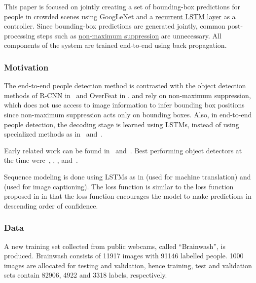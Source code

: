\documentclass[a4paper, 12pt]{article}
\begin{document}
This paper is focused on jointly creating a set of bounding-box predictions for
people in crowded scenes using GoogLeNet and a
\hyperref[LSTM]{recurrent LSTM layer} as a controller. Since bounding-box
predictions are generated jointly, common post-processing steps such as
\hyperref[nonmax_supression]{non-maximum suppression} are unnecessary.  All
components of the system are trained end-to-end using back propagation.

\subsubsection{Motivation}

The end-to-end people detection method is contrasted with the object detection
methods of R-CNN in~\citet{DBLP:journals/corr/GirshickDDM13} and OverFeat in
\citet{DBLP:journals/corr/SermanetEZMFL13}.
\citet{DBLP:journals/corr/GirshickDDM13} and
\citet{DBLP:journals/corr/SermanetEZMFL13} rely on non-maximum suppression,
which does not use access to image information to infer bounding box positions
since non-maximum suppression acts only on bounding boxes. Also, in end-to-end
people detection, the decoding stage is learned using LSTMs, instead of using
specialized methods as in~\citet{VisualPhrases} and~\citet{TaAnSc_14:occluded}.

Early related work can be found in~\citet{Felzenszwalb:2010:ODD:1850486.1850574}
and~\citet{Leibe:2005:PDC:1068507.1069006}. Best performing object detectors at
the time were~\citet{DBLP:journals/corr/GirshickDDM13},
\citet{DBLP:journals/corr/SermanetEZMFL13}, \citet{Uijlings13},
\citet{DBLP:journals/corr/ZhangBS15} and~\citet{DBLP:journals/corr/SzegedyREA14}.

Sequence modeling is done using LSTMs as in
\citet{DBLP:journals/corr/SutskeverVL14} (used for machine translation) and
\citet{DBLP:journals/corr/KarpathyF14} (used for image captioning). The loss
function is similar to the loss function proposed in
\citet{Graves06connectionisttemporal} in that the loss function encourages the
model to make predictions in descending order of confidence.

\subsubsection{Data}

A new training set collected from public webcams, called ``Brainwash'', is
produced. Brainwash consists of 11917 images with 91146 labelled people. 1000
images are allocated for testing and validation, hence training, test and
validation sets contain 82906, 4922 and 3318 labels, respectively.
\end{document}
